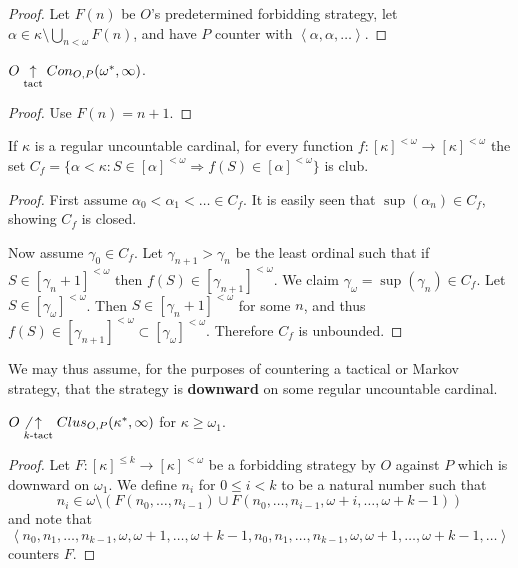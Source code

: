 \begin{proof}
Let $F(n)$ be $O$'s predetermined forbidding strategy, let $\alpha\in\kappa\setminus\bigcup_{n<\omega}F(n)$, and have $P$ counter with $\left<\alpha,\alpha,\dots\right>$.
\end{proof}


\begin{prop}
$O\underset{\text{tact}}{\uparrow}Con_{O,P}(\omega^*,\infty)$.
\end{prop}

\begin{proof}
Use $F(n)=n+1$.
\end{proof}

\begin{thm}
If $\kappa$ is a regular uncountable cardinal, for every function $f:[\kappa]^{<\omega}\to[\kappa]^{<\omega}$ the set $C_f = \{\alpha < \kappa : S\in[\alpha]^{<\omega} \Rightarrow f(S)\in[\alpha]^{<\omega}\}$ is club.
\end{thm}

\begin{proof}
First assume $\alpha_0<\alpha_1<\dots\in C_f$. It is easily seen that $\sup(\alpha_n)\in C_f$, showing $C_f$ is closed.

Now assume $\gamma_0\in C_f$. Let $\gamma_{n+1}>\gamma_n$ be the least ordinal such that if $S\in[\gamma_n+1]^{<\omega}$ then $f(S)\in[\gamma_{n+1}]^{<\omega}$. We claim $\gamma_\omega = \sup(\gamma_n)\in C_f$. Let $S\in[\gamma_\omega]^{<\omega}$. Then $S\in[\gamma_n+1]^{<\omega}$ for some $n$, and thus $f(S)\in[\gamma_{n+1}]^{<\omega}\subset[\gamma_\omega]^{<\omega}$. Therefore $C_f$ is unbounded.
\end{proof}

We may thus assume, for the purposes of countering a tactical or Markov strategy, that the strategy is \textbf{downward} on some regular uncountable cardinal.

\begin{thm}
$O\not\underset{k\text{-tact}}{\uparrow}Clus_{O,P}(\kappa^*,\infty)$ for $\kappa\geq\omega_1$.
\end{thm}

\begin{proof}
Let $F:[\kappa]^{\leq k} \to [\kappa]^{<\omega}$ be a forbidding strategy by $O$ against $P$ which is downward on $\omega_1$. We define $n_i$ for $0\leq i < k$ to be a natural number such that \[ n_i \in \omega \setminus(F(n_0,\dots,n_{i-1}) \cup F(n_0,\dots,n_{i-1},\omega+i,\dots,\omega+k-1))\] and note that\[\left<n_0,n_1,\dots,n_{k-1},\omega,\omega+1,\dots,\omega+k-1,n_0,n_1,\dots,n_{k-1},\omega,\omega+1,\dots,\omega+k-1,\dots\right>\] counters $F$.
\end{proof}

